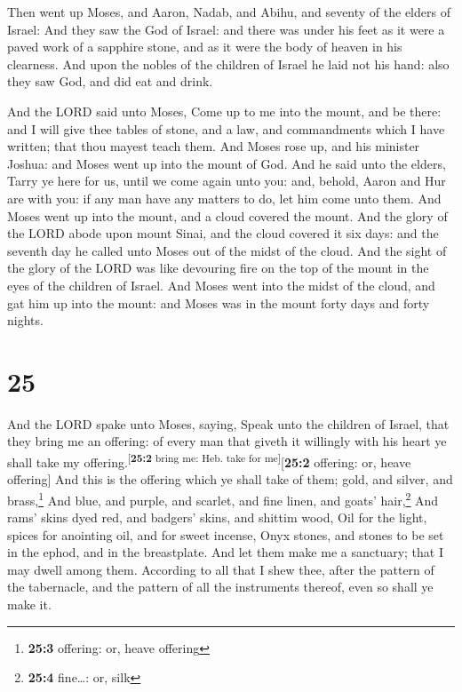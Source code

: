  Then went up Moses, and Aaron, Nadab, and Abihu, and
seventy of the elders of Israel:  And they saw the God of
Israel: and there was under his feet as it were a paved work of a
sapphire stone, and as it were the body of heaven in his clearness.
 And upon the nobles of the children of Israel he laid
not his hand: also they saw God, and did eat and drink.

 And the LORD said unto Moses, Come up to me into the
mount, and be there: and I will give thee tables of stone, and a law,
and commandments which I have written; that thou mayest teach them.
 And Moses rose up, and his minister Joshua: and Moses
went up into the mount of God.  And he said unto the
elders, Tarry ye here for us, until we come again unto you: and, behold,
Aaron and Hur are with you: if any man have any matters to do, let him
come unto them.  And Moses went up into the mount, and a
cloud covered the mount.  And the glory of the LORD abode
upon mount Sinai, and the cloud covered it six days: and the seventh day
he called unto Moses out of the midst of the cloud.  And
the sight of the glory of the LORD was like devouring fire on the top of
the mount in the eyes of the children of Israel.  And
Moses went into the midst of the cloud, and gat him up into the mount:
and Moses was in the mount forty days and forty nights.

\hypertarget{section-24}{%
\section{25}\label{section-24}}

 And the LORD spake unto Moses, saying, 
Speak unto the children of Israel, that they bring me an offering: of
every man that giveth it willingly with his heart ye shall take my
offering.\textsuperscript{{[}\textbf{25:2} bring me: Heb. take for
me{]}}{[}\textbf{25:2} offering: or, heave offering{]} 
And this is the offering which ye shall take of them; gold, and silver,
and brass,\footnote{\textbf{25:3} offering: or, heave offering}
 And blue, and purple, and scarlet, and fine linen, and
goats' hair,\footnote{\textbf{25:4} fine\ldots: or, silk} 
And rams' skins dyed red, and badgers' skins, and shittim wood,
 Oil for the light, spices for anointing oil, and for
sweet incense,  Onyx stones, and stones to be set in the
ephod, and in the breastplate.  And let them make me a
sanctuary; that I may dwell among them.  According to all
that I shew thee, after the pattern of the tabernacle, and the pattern
of all the instruments thereof, even so shall ye make it.

